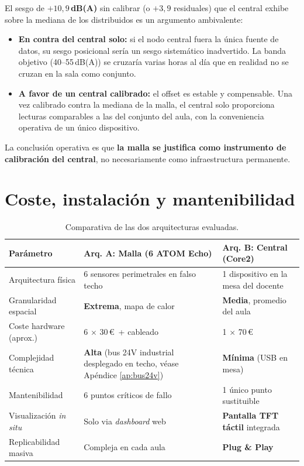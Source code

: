 \documentclass[11pt,a4paper,openany]{report}
\begin{document}
El sesgo de \textbf{$+10{,}9$\,dB(A)} sin calibrar (o $+3{,}9$ residuales) que el central exhibe sobre la mediana de los distribuidos es un argumento ambivalente:

\begin{itemize}
    \item \textbf{En contra del central solo:} si el nodo central fuera la \'unica fuente de datos, su sesgo posicional ser\'ia un sesgo sistem\'atico inadvertido. La banda objetivo (40--55\,dB(A)) se cruzar\'ia varias horas al d\'ia que en realidad no se cruzan en la sala como conjunto.
    \item \textbf{A favor de un central calibrado:} el offset es estable y compensable. Una vez calibrado contra la mediana de la malla, el central solo proporciona lecturas comparables a las del conjunto del aula, con la conveniencia operativa de un \'unico dispositivo.
\end{itemize}

La conclusi\'on operativa es que \textbf{la malla se justifica como instrumento de calibraci\'on del central}, no necesariamente como infraestructura permanente.

\section{Coste, instalaci\'on y mantenibilidad}

\begin{table}[H]
\centering
\footnotesize
{}
\begin{tabularx}{\textwidth}{p{3.5cm} X X}
\toprule
\rowcolor{TableHead}
\textbf{Par\'ametro} & \textbf{Arq. A: Malla (6 ATOM Echo)} & \textbf{Arq. B: Central (Core2)} \\ \midrule
Arquitectura f\'isica   & 6 sensores perimetrales en falso techo & 1 dispositivo en la mesa del docente \\
Granularidad espacial   & \textbf{Extrema}, mapa de calor       & \textbf{Media}, promedio del aula \\
Coste hardware (aprox.) & 6 $\times$ 30\,\euro\ + cableado     & 1 $\times$ 70\,\euro\ \\
Complejidad t\'ecnica   & \textbf{Alta} (bus 24V industrial desplegado en techo, v\'ease Ap\'endice \ref{ap:bus24v}) & \textbf{M\'inima} (USB en mesa) \\
Mantenibilidad          & 6 puntos cr\'iticos de fallo          & 1 \'unico punto sustituible \\
Visualizaci\'on \emph{in situ} & Solo via \emph{dashboard} web    & \textbf{Pantalla TFT t\'actil} integrada \\
Replicabilidad masiva   & Compleja en cada aula                 & \textbf{Plug \& Play} \\ \bottomrule
\end{tabularx}
\caption{Comparativa de las dos arquitecturas evaluadas.}
\end{table}
\end{document}
